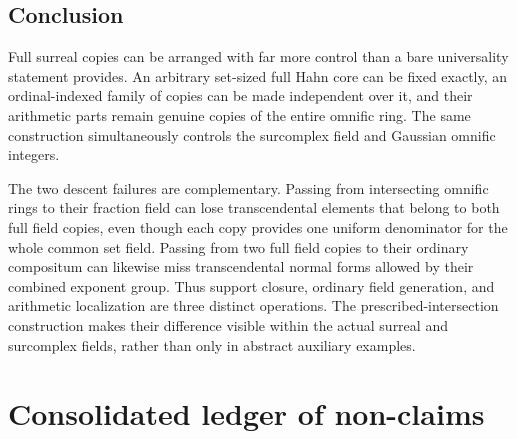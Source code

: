 \documentclass[11pt,letterpaper]{article}
\theoremstyle{definition}
\theoremstyle{remark}
\numberwithin{equation}{section}
\begin{document}
\subsection{Conclusion}

Full surreal copies can be arranged with far more control than a bare
universality statement provides. An arbitrary set-sized full Hahn core can
be fixed exactly, an ordinal-indexed family of copies can be made independent
over it, and their arithmetic parts remain genuine copies of the entire
omnific ring. The same construction simultaneously controls the surcomplex
field and Gaussian omnific integers.

The two descent failures are complementary. Passing from intersecting
omnific rings to their fraction field can lose transcendental elements that
belong to both full field copies, even though each copy provides one uniform
denominator for the whole common set field. Passing from two full field
copies to their ordinary compositum can likewise miss transcendental
normal forms allowed by their combined exponent group. Thus support closure,
ordinary field generation, and arithmetic localization are three distinct
operations. The prescribed-intersection construction makes their difference
visible within the actual surreal and surcomplex fields, rather than only
in abstract auxiliary examples.

\section{Consolidated ledger of non-claims}\label{isc:sec:nonclaims}
\end{document}
